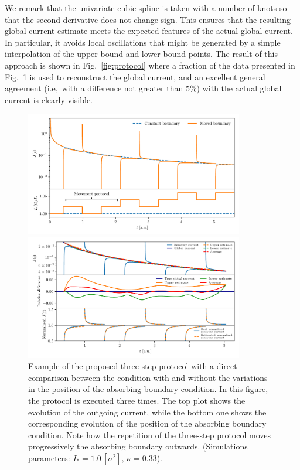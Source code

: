 {We remark that the univariate cubic spline is taken with a number of knots so that the second derivative does not change sign. This ensures that the resulting global current estimate meets the expected features of the actual global current. In particular, it avoids local oscillations that might be generated by a simple interpolation of the upper-bound and lower-bound points. The result of this approach is shown in Fig.~\ref{fig:protocol} where a fraction of the data presented in Fig.~\ref{fig:9} is used to reconstruct the global current, and an excellent general agreement (i.e,\ with a difference not greater than $5\%$) with the actual global current is clearly visible.
%
\begin{figure}[p]
    \centering
    \includegraphics[trim={0 3mm 0 3mm},clip,width=0.85\textwidth]{4_probing_the_diffusive_behavior/figs/final/the_protocol.pdf}
    \caption{Example of the proposed three-step protocol with a direct comparison between the condition with and without the variations in the position of the absorbing boundary condition. In this figure, the protocol is executed three times. The top plot shows the evolution of the outgoing current, while the bottom one shows the corresponding evolution of the position of the absorbing boundary condition. Note how the repetition of the three-step protocol moves progressively the absorbing boundary outwards. (Simulations parameters: $I_\ast = 1.0\,[\sigma^2],\,\kappa = 0.33$).}
    \label{fig:9}
%
    \vspace{1mm}
    \includegraphics[trim={0 3mm 0 3mm},clip,width=0.85\textwidth]{4_probing_the_diffusive_behavior/figs/final/the_interpolation.pdf}

\end{figure}}
